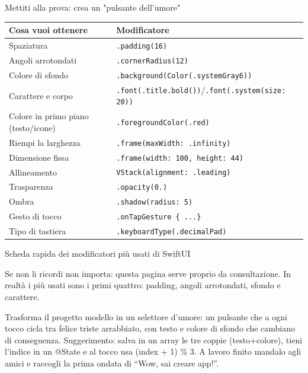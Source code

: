 \begin{tcbpractice}{Mettiti alla prova: crea un "pulsante dell'umore"}

\begin{center}
\begin{tabularx}{\linewidth}{|X|X|}
\hline
\textbf{Cosa vuoi ottenere} & \textbf{Modificatore} \tabularnewline
\hline
Spaziatura & \texttt{.\allowbreak padding(16)} \tabularnewline
Angoli arrotondati & \texttt{.\allowbreak cornerRadius(12)} \tabularnewline
Colore di sfondo & \texttt{.\allowbreak background(Color(.\allowbreak systemGray6))} \tabularnewline
Carattere e corpo & \texttt{.\allowbreak font(.\allowbreak title.\allowbreak bold())}/\texttt{.\allowbreak font(.\allowbreak system(size: 20))} \tabularnewline
Colore in primo piano (testo/icone) & \texttt{.\allowbreak foregroundColor(.\allowbreak red)} \tabularnewline
Riempi la larghezza & \texttt{.\allowbreak frame(maxWidth: .\allowbreak infinity)} \tabularnewline
Dimensione fissa & \texttt{.\allowbreak frame(width: 100, height: 44)} \tabularnewline
Allineamento & \texttt{VStack(alignment: .\allowbreak leading)} \tabularnewline
Trasparenza & \texttt{.\allowbreak opacity(0.\allowbreak 6)} \tabularnewline
Ombra & \texttt{.\allowbreak shadow(radius: 5)} \tabularnewline
Gesto di tocco & \texttt{.\allowbreak onTapGesture \{ .\allowbreak .\allowbreak .\allowbreak  \}} \tabularnewline
Tipo di tastiera & \texttt{.\allowbreak keyboardType(.\allowbreak decimalPad)} \tabularnewline
\hline
\end{tabularx}
\end{center}

\begin{center}\small\color{gray}Scheda rapida dei modificatori più usati di SwiftUI\end{center}

Se non li ricordi non importa: questa pagina serve proprio da consultazione. In realtà i più usati sono i primi quattro: padding, angoli arrotondati, sfondo e carattere.

Trasforma il progetto modello in un selettore d'umore: un pulsante che a ogni tocco cicla tra felice triste arrabbiato, con testo e colore di sfondo che cambiano di conseguenza. Suggerimento: salva in un array le tre coppie (testo+colore), tieni l'indice in un @State e al tocco usa (index + 1) \% 3. A lavoro finito mandalo agli amici e raccogli la prima ondata di “Wow, sai creare app!”.

\end{tcbpractice}

